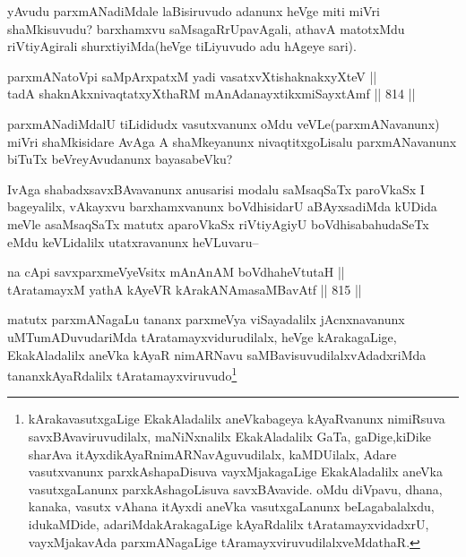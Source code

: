\begin{artha}
yAvudu parxmANadiMdale laBisiruvudo adanunx heVge miti miVri shaMkisuvudu? barxhamxvu saMsagaRrUpavAgali, athavA matotxMdu riVtiyAgirali shurxtiyiMda(heVge tiLiyuvudo adu hAgeye sari).
\end{artha}

\begin{shl}
parxmANatoV\s pi saMpArxpatxM yadi vasatxvXtishaknakxyXteV || \\
tadA shaknAkxnivaqtatxyXthaRM mAnAdanayxtikxmiSayxtAmf \hfill || 814 ||  
\end{shl}

\begin{artha}
parxmANadiMdalU tiLididudx vasutxvanunx oMdu veVLe(parxmANavanunx) miVri shaMkisidare AvAga A shaMkeyanunx nivaqtitxgoLisalu parxmANavanunx biTuTx beVreyAvudanunx bayasabeVku?
\end{artha}


\begin{artha}
IvAga shabadxsavxBAvavanunx anusarisi modalu saMsaqSaTx paroVkaSx I bageyalilx, vAkayxvu barxhamxvanunx boVdhisidarU aBAyxsadiMda kUDida meVle asaMsaqSaTx matutx aparoVkaSx riVtiyAgiyU boVdhisabahudaSeTx eMdu keVLidalilx utatxravanunx heVLuvaru--
\end{artha}

\begin{shl}
na cApi savxparxmeVyeV\s sitx mAnAnAM boVdhaheVtutaH || \\
tAratamayxM yathA kAyeVR kArakANAmasaMBavAtf \hfill || 815 ||  
\end{shl}

\begin{artha}
matutx parxmANagaLu tananx parxmeVya viSayadalilx jAcnxnavanunx uMTumADuvudariMda tAratamayxvidurudilalx, heVge kArakagaLige, EkakAladalilx aneVka kAyaR nimARNavu saMBavisuvudilalxvAdadxriMda tananxkAyaRdalilx tAratamayxviruvudo\footnote{kArakavasutxgaLige EkakAladalilx aneVkabageya kAyaRvanunx nimiRsuva savxBAvaviruvudilalx, maNiNxnalilx EkakAladalilx GaTa, gaDige,kiDike sharAva itAyxdikAyaRnimARNavAguvudilalx, kaMDUilalx, Adare vasutxvanunx parxkAshapaDisuva vayxMjakagaLige EkakAladalilx aneVka vasutxgaLanunx parxkAshagoLisuva savxBAvavide. oMdu diVpavu, dhana, kanaka, vasutx vAhana itAyxdi aneVka vasutxgaLanunx beLagabalalxdu, idukaMDide, adariMdakArakagaLige kAyaRdalilx tAratamayxvidadxrU, vayxMjakavAda parxmANagaLige tAramayxviruvudilalxveMdathaR.}
\end{artha}


